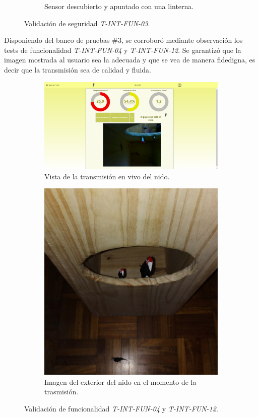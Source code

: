 \begin{figure}[H]
\begin{subfigure}{0.33\textwidth}
        \caption{Sensor descubierto y apuntado con una linterna.}
	\end{subfigure}
	\caption{Validación de seguridad \textit{T-INT-FUN-03}.}
	\label{fig:valLum}
\end{figure}

Disponiendo del banco de pruebas \#3, se corroboró mediante observación los tests de funcionalidad \textit{T-INT-FUN-04} y \textit{T-INT-FUN-12}. Se garantizó que la imagen mostrada al usuario sea la adecuada y que se vea de manera fidedigna, es decir que la transmisión sea de calidad y fluida.
\begin{figure}[H]
	\centering
    	\begin{subfigure}{0.49\textwidth}
        	\centering
        	\includegraphics[width=\linewidth]{ImagenesValidacion del prototipo/t-int-fun-04-12-1}		
			\caption{Vista de la transmisión en vivo del nido.}
        \end{subfigure}\hfill
        \begin{subfigure}{0.49\textwidth}
        	\centering
        	\includegraphics[width=0.5\linewidth]{ImagenesValidacion del prototipo/t-int-fun-04-12-2}
        	\caption{Imagen del exterior del nido en el momento de la trasmisión.}
        \end{subfigure}
	\caption{Validación de funcionalidad \textit{T-INT-FUN-04} y \textit{T-INT-FUN-12}.}
\end{figure}

